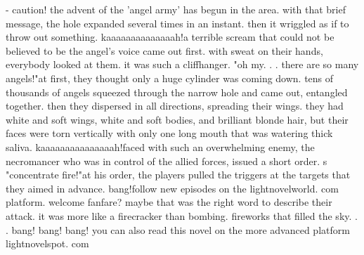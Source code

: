 - caution! the advent of the 'angel army' has begun in the area.
with that brief message, the hole expanded several times in an instant.
 then it wriggled as if to throw out something.
kaaaaaaaaaaaaaah!a terrible scream that could not be believed to be the angel's voice came out first.
with sweat on their hands, everybody looked at them.
 it was such a cliffhanger.
"oh my.
.
.
there are so many angels!"at first, they thought only a huge cylinder was coming down.
 tens of thousands of angels squeezed through the narrow hole and came out, entangled together.
 then they dispersed in all directions, spreading their wings.
they had white and soft wings, white and soft bodies, and brilliant blonde hair, but their faces were torn vertically with only one long mouth that was watering thick saliva.
kaaaaaaaaaaaaaaah!faced with such an overwhelming enemy, the necromancer who was in control of the allied forces, issued a short order.
s "concentrate fire!"at his order, the players pulled the triggers at the targets that they aimed in advance.
bang!follow new episodes on the lightnovelworld.
c‌om platform.
welcome fanfare? maybe that was the right word to describe their attack.
 it was more like a firecracker than bombing.
 fireworks that filled the sky.
.
.
bang! bang! bang! you can also read this novel on the more advanced platform lightnovelspot.
com

 